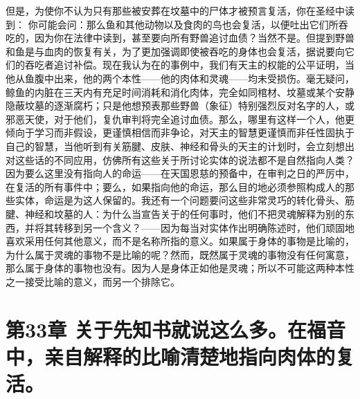 但是，为使你不认为只有那些被安葬在坟墓中的尸体才被预言复活，你在圣经中读到： 你可能会问：那么鱼和其他动物以及食肉的鸟也会复活，以便吐出它们所吞吃的，因为你在法律中读到，甚至要向所有野兽追讨血债？当然不是。但提到野兽和鱼是与血肉的恢复有关，为了更加强调即使被吞吃的身体也会复活，据说要向它们的吞吃者追讨补偿。现在我认为在的事例中，我们有天主的权能的公平证明，当他从鱼腹中出来，他的两个本性——他的肉体和灵魂——均未受损伤。毫无疑问，鲸鱼的内脏在三天内有充足时间消耗和消化肉体，完全如同棺材、坟墓或某个安静隐蔽坟墓的逐渐腐朽；只是他想预表那些野兽（象征）特别强烈反对名字的人，或邪恶天使，对于他们，复仇审判将完全追讨血债。那么，哪里有这样一个人，他更倾向于学习而非假设，更谨慎相信而非争论，对天主的智慧更谨慎而非任性固执于自己的智慧，当他听到有关筋腱、皮肤、神经和骨头的天主的计划时，会立刻想出对这些话的不同应用，仿佛所有这些关于所讨论实体的说法都不是自然指向人类？因为要么这里没有指向人的命运——在天国恩慈的预备中，在审判之日的严厉中，在复活的所有事件中；要么，如果指向他的命运，那么目的地必须参照构成人的那些实体，命运是为这人保留的。我还有一个问题要问这些非常灵巧的转化骨头、筋腱、神经和坟墓的人：为什么当宣告关于的任何事时，他们不把灵魂解释为别的东西，并将其转移到另一个含义？——因为每当对实体作出明确陈述时，他们顽固地喜欢采用任何其他意义，而不是名称所指的意义。如果属于身体的事物是比喻的，为什么属于灵魂的事物不是比喻的呢？然而，既然属于灵魂的事物没有任何寓意，那么属于身体的事物也没有。因为人是身体正如他是灵魂；所以不可能这两种本性之一接受比喻的意义，而另一个排除它。\par


\section{第33章 关于先知书就说这么多。在福音中，亲自解释的比喻清楚地指向肉体的复活。}

